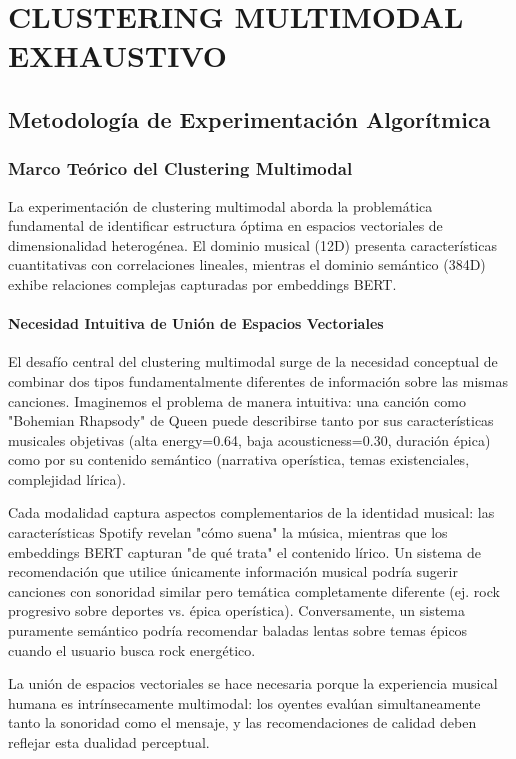 \documentclass[12pt,a4paper]{report}
\begin{document}
\chapter{CLUSTERING MULTIMODAL EXHAUSTIVO}

\section{Metodología de Experimentación Algorítmica}

\subsection{Marco Teórico del Clustering Multimodal}

La experimentación de clustering multimodal aborda la problemática fundamental de identificar estructura óptima en espacios vectoriales de dimensionalidad heterogénea. El dominio musical (12D) presenta características cuantitativas con correlaciones lineales, mientras el dominio semántico (384D) exhibe relaciones complejas capturadas por embeddings BERT.

\subsubsection{Necesidad Intuitiva de Unión de Espacios Vectoriales}

El desafío central del clustering multimodal surge de la necesidad conceptual de combinar dos tipos fundamentalmente diferentes de información sobre las mismas canciones. Imaginemos el problema de manera intuitiva: una canción como "Bohemian Rhapsody" de Queen puede describirse tanto por sus características musicales objetivas (alta energy=0.64, baja acousticness=0.30, duración épica) como por su contenido semántico (narrativa operística, temas existenciales, complejidad lírica).

Cada modalidad captura aspectos complementarios de la identidad musical: las características Spotify revelan "cómo suena" la música, mientras que los embeddings BERT capturan "de qué trata" el contenido lírico. Un sistema de recomendación que utilice únicamente información musical podría sugerir canciones con sonoridad similar pero temática completamente diferente (ej. rock progresivo sobre deportes vs. épica operística). Conversamente, un sistema puramente semántico podría recomendar baladas lentas sobre temas épicos cuando el usuario busca rock energético.

La unión de espacios vectoriales se hace necesaria porque la experiencia musical humana es intrínsecamente multimodal: los oyentes evalúan simultaneamente tanto la sonoridad como el mensaje, y las recomendaciones de calidad deben reflejar esta dualidad perceptual.
\end{document}
